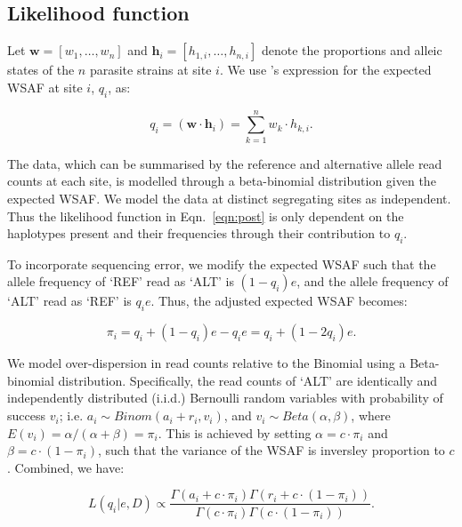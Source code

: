 \documentclass{nature}
\begin{document}
\subsection*{Likelihood function}

Let $\mathbf w = [w_1,\dots, w_n]$ and $\mathbf{h}_i = [h_{1,i},\dots,h_{n,i}]$ denote the proportions and alleic states of the $n$ parasite strains at site $i$. We use \cite{Jack2016}'s expression for the expected WSAF at site $i$, $q_{i}$, as:

\begin{equation}
q_i= (\mathbf{w}\cdot\mathbf{h}_{i})  =  \sum_{k=1}^{n} w_k \cdot h_{k,i} .\label{eqn:qij_full_sum}
\end{equation}

\noindent The data, which can be summarised by the reference and alternative allele read counts at each site, is modelled through a beta-binomial distribution given the expected WSAF.  We model the data at distinct segregating sites as independent.  Thus the likelihood function  in Eqn.~\eqref{eqn:post} is only dependent on the haplotypes present and their frequencies through their contribution to $q_{i}$.


To incorporate sequencing error, we modify the expected WSAF such that the allele frequency of `REF' read as `ALT' is $(1 - q_i)e$, and the allele frequency of `ALT' read as `REF' is $q_ie$. Thus, the adjusted expected WSAF becomes:

\begin{equation}
\pi_i = q_i + (1 - q_i)e - q_ie = q_i + (1 - 2q_i)e.\label{eqn:adj_q}
\end{equation}

\noindent We model over-dispersion in read counts relative to the Binomial using a Beta-binomial distribution. Specifically, the read counts of `ALT' are identically and independently distributed (i.i.d.) Bernoulli random variables with probability of success $v_i$; i.e. $a_i \sim Binom(a_i + r_i, v_i)$, and $v_i \sim Beta(\alpha, \beta)$, where $E(v_i) = \alpha/(\alpha+\beta) = \pi_{i}$. This is achieved by setting $\alpha = c\cdot \pi_{i} $ and $\beta = c\cdot (1-\pi_{i})$, such that the variance of the WSAF is inversley proportion to $c$.  Combined, we have:

\begin{equation}
L(q_{i}| e, D) \propto \frac{\Gamma(a_i + c\cdot \pi_{i}) \Gamma(r_i + c\cdot (1-\pi_{i}))}{\Gamma(c\cdot \pi_{i})\Gamma(c\cdot (1-\pi_{i}))}. \label{eqn:llk}
\end{equation}
\end{document}
